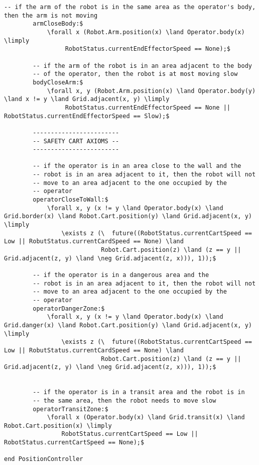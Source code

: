 \begin{lstlisting}[fontadjust, mathescape, frame=single]
        -- if the arm of the robot is in the same area as the operator's body, then the arm is not moving
        armCloseBody:$
            \forall x (Robot.Arm.position(x) \land Operator.body(x) \limply
                 RobotStatus.currentEndEffectorSpeed == None);$

        -- if the arm of the robot is in an area adjacent to the body
        -- of the operator, then the robot is at most moving slow
        bodyCloseArm:$
            \forall x, y (Robot.Arm.position(x) \land Operator.body(y) \land x != y \land Grid.adjacent(x, y) \limply
                 RobotStatus.currentEndEffectorSpeed == None || RobotStatus.currentEndEffectorSpeed == Slow);$

        ------------------------       
        -- SAFETY CART AXIOMS --
        ------------------------

        -- if the operator is in an area close to the wall and the
        -- robot is in an area adjacent to it, then the robot will not
        -- move to an area adjacent to the one occupied by the
        -- operator
        operatorCloseToWall:$
            \forall x, y (x != y \land Operator.body(x) \land Grid.border(x) \land Robot.Cart.position(y) \land Grid.adjacent(x, y) \limply
                \exists z (\  future((RobotStatus.currentCartSpeed == Low || RobutStatus.currentCardSpeed == None) \land
                           Robot.Cart.position(z) \land (z == y || Grid.adjacent(z, y) \land \neg Grid.adjacent(z, x))), 1));$

        -- if the operator is in a dangerous area and the
        -- robot is in an area adjacent to it, then the robot will not
        -- move to an area adjacent to the one occupied by the
        -- operator
        operatorDangerZone:$
            \forall x, y (x != y \land Operator.body(x) \land Grid.danger(x) \land Robot.Cart.position(y) \land Grid.adjacent(x, y) \limply
                \exists z (\  future((RobotStatus.currentCartSpeed == Low || RobutStatus.currentCardSpeed == None) \land
                           Robot.Cart.position(z) \land (z == y || Grid.adjacent(z, y) \land \neg Grid.adjacent(z, x))), 1));$


        -- if the operator is in a transit area and the robot is in
        -- the same area, then the robot needs to move slow
        operatorTransitZone:$
            \forall x (Operator.body(x) \land Grid.transit(x) \land Robot.Cart.position(x) \limply
                RobotStatus.currentCartSpeed == Low || RobotStatus.currentCartSpeed == None);$

end PositionController                
\end{lstlisting}